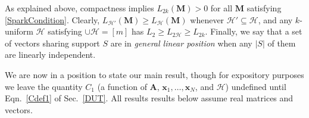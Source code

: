 \documentclass[journal, twocolumn]{IEEEtran}
\begin{document}
As explained above, compactness implies $L_{2k}(\mathbf{M}) > 0$ for all $\mathbf{M}$ satisfying \eqref{SparkCondition}. Clearly, $L_{\mathcal{H}'}(\mathbf{M}) \geq L_\mathcal{H}(\mathbf{M})$ whenever $\mathcal{H}' \subseteq \mathcal{H}$, and any $k$-uniform $\mathcal{H}$ satisfying $\cup \mathcal{H} = [m]$ has $L_2 \geq L_{2\mathcal{H}} \geq L_{2k}$.  Finally, we say that a set of vectors sharing support $S$ are in \emph{general linear position} when any $|S|$ of them are linearly independent.

We are now in a position to state our main result, though for expository purposes we leave the quantity $C_1$ (a function of $\mathbf{A}$, $\mathbf{x}_1, \ldots, \mathbf{x}_N$, and $\mathcal{H}$) undefined until Eqn.~\eqref{Cdef1} of Sec.~\ref{DUT}. All results results below assume real matrices and vectors. 

\end{document}
